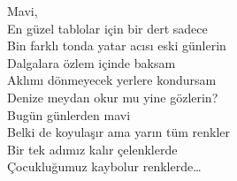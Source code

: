 \noindent\newline
Mavi, \\
En güzel tablolar için bir dert sadece \\
Bin farklı tonda yatar acısı eski günlerin \\
Dalgalara özlem içinde baksam \\
Aklımı dönmeyecek yerlere kondursam \\
Denize meydan okur mu yine gözlerin? \\

\noindent\newline
Bugün günlerden mavi \\
Belki de koyulaşır ama yarın tüm renkler \\
Bir tek adımız kalır çelenklerde \\
Çocukluğumuz kaybolur renklerde… \\